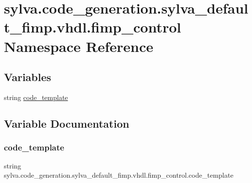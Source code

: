 \hypertarget{namespacesylva_1_1code__generation_1_1sylva__default__fimp_1_1vhdl_1_1fimp__control}{}\section{sylva.\+code\+\_\+generation.\+sylva\+\_\+default\+\_\+fimp.\+vhdl.\+fimp\+\_\+control Namespace Reference}
\label{namespacesylva_1_1code__generation_1_1sylva__default__fimp_1_1vhdl_1_1fimp__control}
\subsection*{Variables}
\begin{DoxyCompactItemize}
\item 
string \hyperlink{namespacesylva_1_1code__generation_1_1sylva__default__fimp_1_1vhdl_1_1fimp__control_aefb2de2649d3e3105eac829de335e988}{code\+\_\+template}
\end{DoxyCompactItemize}


\subsection{Variable Documentation}
\mbox{\label{namespacesylva_1_1code__generation_1_1sylva__default__fimp_1_1vhdl_1_1fimp__control_aefb2de2649d3e3105eac829de335e988}} 
\subsubsection{\texorpdfstring{code\+\_\+template}{code\_template}}
{\footnotesize\ttfamily string sylva.\+code\+\_\+generation.\+sylva\+\_\+default\+\_\+fimp.\+vhdl.\+fimp\+\_\+control.\+code\+\_\+template}

